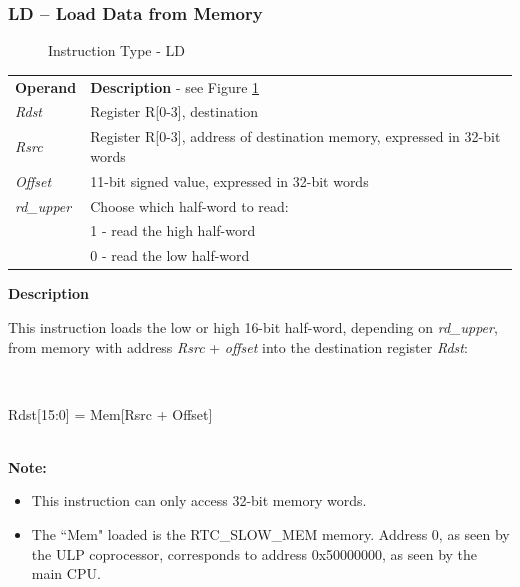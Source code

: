 \documentclass[main\_\_EN.tex]{subfiles}
\begin{document}
\subsubsection{LD – Load Data from Memory}

%
%
%
%
%
%
%
\begin{figure}[!ht]
    \centering
    \caption{Instruction Type - LD}
    \label{figure:LD}
\end{figure}

\begin{tabular}{ l l }
\textbf{Operand} & \textbf{Description} - see Figure  \ref{figure:LD} \\
\textit{Rdst} & Register R[0-3], destination \\
\textit{Rsrc} &Register R[0-3], address of destination memory, expressed in 32-bit words \\
\textit{Offset} & 11-bit signed value, expressed in 32-bit words\\
\textit{rd\_upper} & Choose which half-word to read: \\
 & 1 - read the high half-word\\
 & 0 - read the low half-word \\ 


\end{tabular}

\textbf{Description}

This instruction loads the low or high 16-bit half-word, depending on \textit{rd\_upper}, from memory with address \textit{Rsrc} + \textit{offset} into the destination register \textit{Rdst}:

~
\begin{centering}
    Rdst[15:0] = Mem[Rsrc + Offset]\\
\end{centering}
~\\

\vspace{-2em}
\textbf{Note:}
\begin{itemize}
    \item This instruction can only access 32-bit memory words.
    \item The ``Mem" loaded is the RTC\_SLOW\_MEM memory. Address 0, as seen by the ULP coprocessor, corresponds to address 0x{}50000000, as seen by the main CPU.
\end{itemize}
\end{document}
